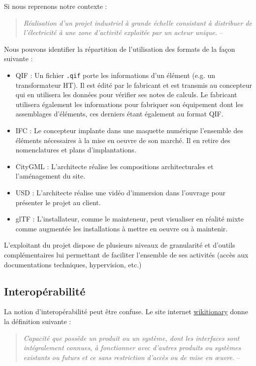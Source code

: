 \documentclass[a4paper,12pt]{article}
\begin{document}
Si nous reprenons notre contexte : 
\begin{quote}
\emph{Réalisation d'un projet industriel à grande échelle consistant à distribuer de l'électricité à une zone d'activité exploitée par un acteur unique.} -- 
\end{quote}

Nous pouvons identifier la répartition de l'utilisation des formats de la façon suivante :
\begin{itemize}
\item QIF : Un fichier \texttt{.qif} porte les informations d'un élément (e.g. un transformateur HT). Il est édité par le fabricant et est transmis au concepteur qui en utilisera les données pour vérifier ses notes de calculs. Le fabricant utilisera également les informations pour fabriquer son équipement dont les assemblages d'éléments, ces derniers étant également au format QIF.
\item IFC : Le concepteur implante dans une maquette numérique l'ensemble des éléments nécessaires à la mise en oeuvre de son marché. Il en retire des nomenclatures et plans d'implantations.
\item CityGML : L'architecte réalise les compositions architecturales et l'aménagement du site.
\item USD : L'architecte réalise une vidéo d'immersion dans l'ouvrage pour présenter le projet au client.
\item glTF : L'installateur, comme le mainteneur, peut visualiser en réalité mixte comme augmentée les installations à mettre en oeuvre ou à maintenir.
\end{itemize}

L'exploitant du projet dispose de plusieurs niveaux de granularité et d'outils complémentaires lui permettant de faciliter l'ensemble de ses activités (accès aux documentations techniques, hypervision, etc.)
\subsection*{Interopérabilité}
\label{sec:org4705746}

La notion d'interopérabilité peut être confuse. Le site internet \href{https://fr.wikitionary.org}{wikitionary} donne la définition suivante :

\begin{quote}
\emph{Capacité que possède un produit ou un système, dont les interfaces sont intégralement connues, à fonctionner avec d’autres produits ou systèmes existants ou futurs et ce sans restriction d’accès ou de mise en œuvre.} -- \autocite{wiktionaryInteroprabilitWiktionnaire}
\end{quote}
\end{document}
